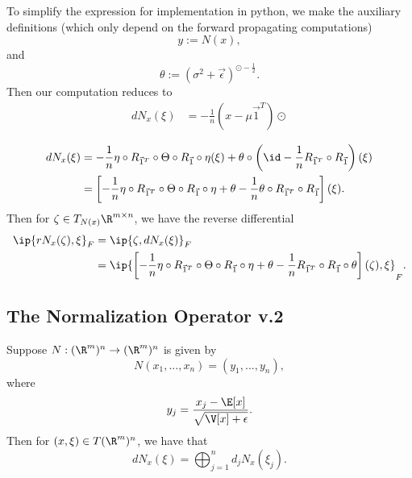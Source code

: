 To simplify the expression for implementation in python, we make the auxiliary definitions (which only depend on the forward propagating computations)
$$y:=N(x),$$
and
$$\theta:=(\sigma^2+\vec{\epsilon})^{\odot-\frac{1}{2}}.$$
Then our computation reduces to
\begin{align*}
	dN_x(\xi)&=-\frac{1}{n}(x-\mu\vec{1}^T)\odot
\end{align*}















\begin{align*}
	dN_x(\xi)&=-\frac{1}{n}\eta\circ R_{\vec{1}^T}\circ\Theta\circ R_{\vec{1}}\circ\eta(\xi)+\theta\circ\left(\id-\frac{1}{n}R_{\vec{1}^T}\circ R_{\vec{1}}\right)(\xi)\\
	&=\left[-\frac{1}{n}\eta\circ R_{\vec{1}^T}\circ\Theta\circ R_{\vec{1}}\circ\eta+\theta-\frac{1}{n}\theta\circ R_{\vec{1}^T}\circ R_{\vec{1}}\right](\xi).
\end{align*}
Then for $\zeta\in T_{N(x)}\R^{m\times n}$, we have the reverse differential
\begin{align*}
	\ip{rN_x(\zeta),\xi}_F&=\ip{\zeta,dN_x(\xi)}_F\\
	&=\ip{\left[-\frac{1}{n}\eta\circ R_{\vec{1}^T}\circ \Theta\circ R_{\vec{1}}\circ\eta+\theta-\frac{1}{n}R_{\vec{1}^T}\circ R_{\vec{1}}\circ\theta\right](\zeta),\xi}_F.
\end{align*}










\subsection{The Normalization Operator v.2}

Suppose $N:(\R^m)^n\to(\R^m)^n$ is given by
$$N(x_1,...,x_n)=(y_1,...,y_n),$$
where
$$y_j=\frac{x_j-\E[x]}{\sqrt{\V[x]+\epsilon}}.$$
Then for $(x,\xi)\in T(\R^m)^n$, we have that
$$dN_x(\xi)=\bigoplus_{j=1}^nd_jN_x(\xi_j).$$

